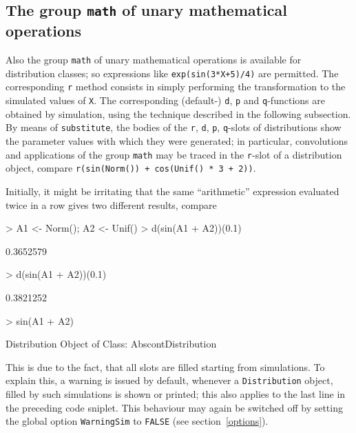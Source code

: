 \documentclass[11pt]{article}
\newcommand{\code}[1]{{\tt #1}}
\begin{document}
\subsection[The group math of unary mathematical operations]{The group
\code{math} of unary mathematical operations}
%
Also the group \code{math} of unary mathematical operations is available for
distribution classes; so
expressions like \code{exp(sin(3*X+5)/4)} are permitted.
%
 The corresponding \code{r} method consists in simply
performing the transformation to the simulated values of \code{X}.
The corresponding (default-) \code{d}, \code{p} and \code{q}-functions are
obtained by simulation, using the technique described in the following
subsection.\\
By means of \code{substitute}, the bodies of the \code{r}, \code{d},
\code{p}, \code{q}-slots of distributions show the parameter values with
which they were generated; in particular,
convolutions and applications of the group \code{math} may be traced in
the \code{r}-slot of a distribution object, compare\newline
\code{r(sin(Norm()) + cos(Unif() * 3 + 2))}.

Initially, it might be irritating that the same ``arithmetic'' expression
evaluated twice in a row gives two different results, compare
\begin{Schunk}
\begin{Sinput}
>   A1 <- Norm(); A2 <- Unif()
>   d(sin(A1 + A2))(0.1)
\end{Sinput}
\begin{Soutput}
[1] 0.3652579
\end{Soutput}
\begin{Sinput}
>   d(sin(A1 + A2))(0.1)
\end{Sinput}
\begin{Soutput}
[1] 0.3821252
\end{Soutput}
\begin{Sinput}
>   sin(A1 + A2)
\end{Sinput}
\begin{Soutput}
Distribution Object of Class: AbscontDistribution
\end{Soutput}
\end{Schunk}
This is due to the fact, that all slots are filled starting from simulations.
To explain this, a warning is issued  by default, whenever a \code{Distribution}
object, filled by such simulations is shown or printed; this also applies to the
last line in the preceding code sniplet. This behaviour may again be switched
off by setting the global option
\code{WarningSim} to \code{FALSE} (see section~\ref{options}).\\
\end{document}
